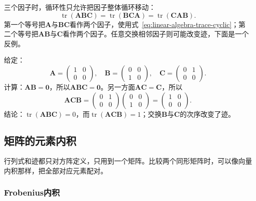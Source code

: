 三个因子时，循环性只允许把因子整体循环移动：
\[
 \operatorname{tr}(\bm A\bm B\bm C)=\operatorname{tr}(\bm B\bm C\bm A)=\operatorname{tr}(\bm C\bm A\bm B).
\]
第一个等号把$\bm A$与$\bm B\bm C$看作两个因子，使用式~\eqref{eq:linear-algebra-trace-cyclic}；第二个等号把$\bm A\bm B$与$\bm C$看作两个因子。任意交换相邻因子则可能改变迹，下面是一个反例。
\begin{example}[反例：交换相邻因子会改变迹]
\label{ex:ls-trace-adjacent-swap}
给定：
\[
 \bm A=\begin{pmatrix}1&0\\0&0\end{pmatrix},\quad
 \bm B=\begin{pmatrix}0&0\\1&0\end{pmatrix},\quad
 \bm C=\begin{pmatrix}0&1\\0&0\end{pmatrix}.
\]
计算：$\bm A\bm B=\bm0$，所以$\bm A\bm B\bm C=\bm0$。另一方面$\bm A\bm C=\bm C$，所以
\[
 \bm A\bm C\bm B=\begin{pmatrix}0&1\\0&0\end{pmatrix}\begin{pmatrix}0&0\\1&0\end{pmatrix}=\begin{pmatrix}1&0\\0&0\end{pmatrix}.
\]
结论：$\operatorname{tr}(\bm A\bm B\bm C)=0$，而$\operatorname{tr}(\bm A\bm C\bm B)=1$；交换$\bm B$与$\bm C$的次序改变了迹。
\end{example}

\subsection{矩阵的元素内积}

行列式和迹都只对方阵定义，只用到一个矩阵。比较两个同形矩阵时，可以像向量内积那样，把全部对应元素配对。

\subsubsection{Frobenius内积}

